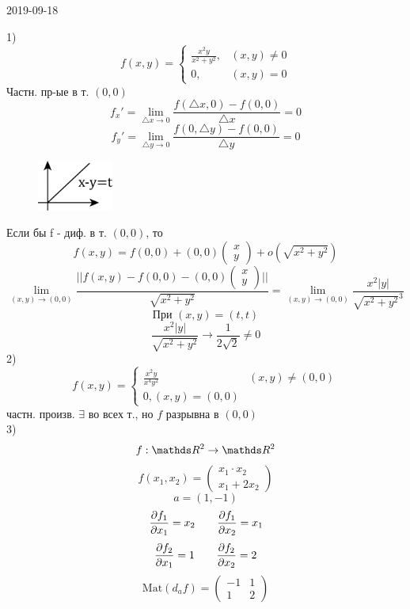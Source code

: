 \documentclass[main]{subfiles}
\begin{document}
\begin{lect} {2019-09-18}
	\begin{example}
		1)
		\[f(x, y) = \begin{cases}
				\frac{x^2 y}{x^2 + y^2}, & (x, y) \neq 0 \\
				0,                       & (x, y) = 0
			\end{cases}\]
		Частн. пр-ые в т. $(0, 0)$
		\[f_x' = \lim_{\triangle x \to 0} \frac{f(\triangle x, 0) - f(0, 0)}{\triangle x} = 0 \]
		\[f_y' = \lim_{\triangle y \to 0} \frac{f(0, \triangle y) - f(0, 0)}{\triangle y} = 0\]
		\begin{figure}[H]
			\includegraphics[width = 2.5cm]{pics/4_1}
			\centering
		\end{figure}
		Если бы f - диф. в т. $(0, 0)$, то
		\[f(x, y) = f(0, 0) + (0, 0) \begin{pmatrix}
				x \\
				y
			\end{pmatrix}
			+ o(\sqrt{x^2 + y^2})
		\]
		\[\lim_{(x, y) \to (0, 0)} \frac{||f(x, y) - f(0, 0) - (0, 0) \begin{pmatrix}
					x \\
					y
				\end{pmatrix}||}{\sqrt{x^2 + y^2}} =
			\lim_{(x, y) \to (0, 0)} \frac{x^2|y|}{ \sqrt{x^2 + y^2}^3} \]
		\[\text{При } (x, y) = (t, t)\]
		\[\frac{x^2|y|}{\sqrt{x^2 + y^2}} \to \frac{1}{2\sqrt{2}} \neq 0\]
		2)
		\[f(x, y) = \begin{cases}
				\frac{x^2 y}{x^4 y^2} & (x, y) \neq (0, 0) \\
				0 , (x, y) = (0, 0)
			\end{cases}\]
		частн. произв. $\exists$ во всех т., но $f$ разрывна в $(0, 0)$\\
		3)
		\[f: \R^2 \to \R^2\]
		\[f(x_1, x_2) = \begin{pmatrix}
				x_1 \cdot x_2 \\
				x_1 + 2x_2
			\end{pmatrix}\]
		\[a = (1, -1)\]
		\[\frac{\partial f_1}{\partial x_1} = x_2 \quad\quad \frac{\partial f_1}{\partial x_2} = x_1\]
		\[\frac{\partial f_2}{\partial x_1} = 1 \quad\quad \frac{\partial f_2}{\partial x_2} = 2\]
		\[\text{Mat}(d_a f) = \begin{pmatrix}
				-1 & 1 \\
				1  & 2
			\end{pmatrix}\]

\end{example}
\end{lect}
\end{document}
